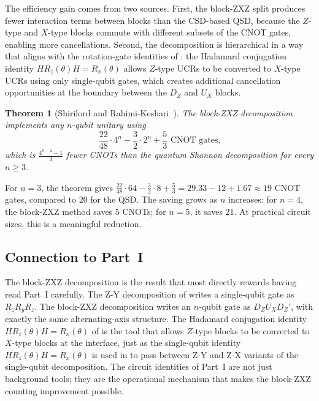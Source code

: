 \documentclass[12pt, a4paper, oneside]{report}
\theoremstyle{plain}
\newtheorem{theorem}{Theorem}[chapter]
\theoremstyle{definition}
\theoremstyle{remark}
\newcommand{\Rx}{R_x}
\newcommand{\Ry}{R_y}
\newcommand{\Rz}{R_z}
\begin{document}
The efficiency gain comes from two sources. First, the block-ZXZ split produces fewer
interaction terms between blocks than the CSD-based QSD, because the $Z$-type and $X$-type
blocks commute with different subsets of the CNOT gates, enabling more cancellations.
Second, the decomposition is hierarchical in a way that aligns with the rotation-gate
identities of : the Hadamard conjugation identity
$H\Rz(\theta)H = \Rx(\theta)$ allows $Z$-type UCRs to be converted to $X$-type UCRs
using only single-qubit gates, which creates additional cancellation opportunities at the
boundary between the $D_Z$ and $U_X$ blocks.

\begin{theorem}[Shirilord and Rahimi-Keshari~\cite{shirilord2024}]
\label{thm:shirilord}
The block-ZXZ decomposition implements any $n$-qubit unitary using
\[
  \frac{22}{48} \cdot 4^n - \frac{3}{2} \cdot 2^n + \frac{5}{3} \text{ CNOT gates,}
\]
which is $\frac{4^{n-2}-1}{3}$ fewer CNOTs than the quantum Shannon decomposition for
every $n \geq 3$.
\end{theorem}

For $n = 3$, the theorem gives $\frac{22}{48} \cdot 64 - \frac{3}{2} \cdot 8 + \frac{5}{3}
= 29.33 - 12 + 1.67 \approx 19$ CNOT gates, compared to 20 for the QSD. The saving grows
as $n$ increases: for $n = 4$, the block-ZXZ method saves $5$ CNOTs; for $n = 5$, it saves
$21$. At practical circuit sizes, this is a meaningful reduction.

\subsection{Connection to Part~I}

The block-ZXZ decomposition is the result that most directly rewards having read Part~I
carefully. The Z-Y decomposition of  writes a single-qubit gate as
$\Rz\Ry\Rz$. The block-ZXZ decomposition writes an $n$-qubit gate as $D_Z U_X D_Z'$, with
exactly the same alternating-axis structure. The Hadamard conjugation identity
$H\Rz(\theta)H = \Rx(\theta)$ of  is the tool that allows $Z$-type
blocks to be converted to $X$-type blocks at the interface, just as the single-qubit identity
$H\Rz(\theta)H = \Rx(\theta)$ is used in  to pass between Z-Y and Z-X
variants of the single-qubit decomposition. The circuit identities of Part~I are not just
background tools; they are the operational mechanism that makes the block-ZXZ counting
improvement possible.
\end{document}
